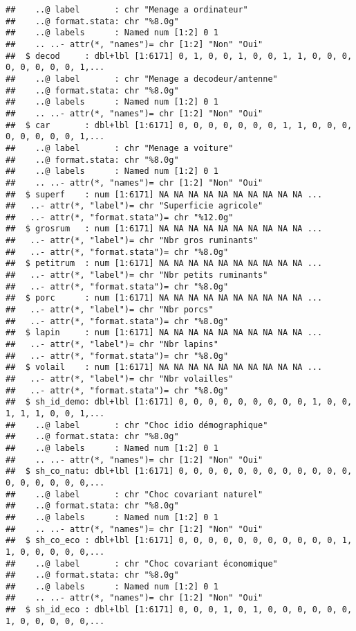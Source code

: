 \documentclass[
]{article}
\begin{document}
\begin{verbatim}
##    ..@ label       : chr "Menage a ordinateur"
##    ..@ format.stata: chr "%8.0g"
##    ..@ labels      : Named num [1:2] 0 1
##    .. ..- attr(*, "names")= chr [1:2] "Non" "Oui"
##  $ decod     : dbl+lbl [1:6171] 0, 1, 0, 0, 1, 0, 0, 1, 1, 0, 0, 0, 0, 0, 0, 0, 0, 1,...
##    ..@ label       : chr "Menage a decodeur/antenne"
##    ..@ format.stata: chr "%8.0g"
##    ..@ labels      : Named num [1:2] 0 1
##    .. ..- attr(*, "names")= chr [1:2] "Non" "Oui"
##  $ car       : dbl+lbl [1:6171] 0, 0, 0, 0, 0, 0, 0, 1, 1, 0, 0, 0, 0, 0, 0, 0, 0, 1,...
##    ..@ label       : chr "Menage a voiture"
##    ..@ format.stata: chr "%8.0g"
##    ..@ labels      : Named num [1:2] 0 1
##    .. ..- attr(*, "names")= chr [1:2] "Non" "Oui"
##  $ superf    : num [1:6171] NA NA NA NA NA NA NA NA NA NA ...
##   ..- attr(*, "label")= chr "Superficie agricole"
##   ..- attr(*, "format.stata")= chr "%12.0g"
##  $ grosrum   : num [1:6171] NA NA NA NA NA NA NA NA NA NA ...
##   ..- attr(*, "label")= chr "Nbr gros ruminants"
##   ..- attr(*, "format.stata")= chr "%8.0g"
##  $ petitrum  : num [1:6171] NA NA NA NA NA NA NA NA NA NA ...
##   ..- attr(*, "label")= chr "Nbr petits ruminants"
##   ..- attr(*, "format.stata")= chr "%8.0g"
##  $ porc      : num [1:6171] NA NA NA NA NA NA NA NA NA NA ...
##   ..- attr(*, "label")= chr "Nbr porcs"
##   ..- attr(*, "format.stata")= chr "%8.0g"
##  $ lapin     : num [1:6171] NA NA NA NA NA NA NA NA NA NA ...
##   ..- attr(*, "label")= chr "Nbr lapins"
##   ..- attr(*, "format.stata")= chr "%8.0g"
##  $ volail    : num [1:6171] NA NA NA NA NA NA NA NA NA NA ...
##   ..- attr(*, "label")= chr "Nbr volailles"
##   ..- attr(*, "format.stata")= chr "%8.0g"
##  $ sh_id_demo: dbl+lbl [1:6171] 0, 0, 0, 0, 0, 0, 0, 0, 0, 1, 0, 0, 1, 1, 1, 0, 0, 1,...
##    ..@ label       : chr "Choc idio démographique"
##    ..@ format.stata: chr "%8.0g"
##    ..@ labels      : Named num [1:2] 0 1
##    .. ..- attr(*, "names")= chr [1:2] "Non" "Oui"
##  $ sh_co_natu: dbl+lbl [1:6171] 0, 0, 0, 0, 0, 0, 0, 0, 0, 0, 0, 0, 0, 0, 0, 0, 0, 0,...
##    ..@ label       : chr "Choc covariant naturel"
##    ..@ format.stata: chr "%8.0g"
##    ..@ labels      : Named num [1:2] 0 1
##    .. ..- attr(*, "names")= chr [1:2] "Non" "Oui"
##  $ sh_co_eco : dbl+lbl [1:6171] 0, 0, 0, 0, 0, 0, 0, 0, 0, 0, 0, 1, 1, 0, 0, 0, 0, 0,...
##    ..@ label       : chr "Choc covariant économique"
##    ..@ format.stata: chr "%8.0g"
##    ..@ labels      : Named num [1:2] 0 1
##    .. ..- attr(*, "names")= chr [1:2] "Non" "Oui"
##  $ sh_id_eco : dbl+lbl [1:6171] 0, 0, 0, 1, 0, 1, 0, 0, 0, 0, 0, 0, 1, 0, 0, 0, 0, 0,...

\end{verbatim}
\end{document}
